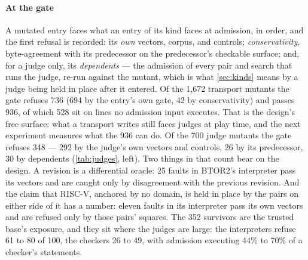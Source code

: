 \paragraph{At the gate}
A mutated entry faces what an entry of its kind faces at admission,
in order, and the first refusal is recorded: its \emph{own} vectors,
corpus, and controls; \emph{conservativity}, byte-agreement with its
predecessor on the predecessor's checkable surface; and, for a judge
only, its \emph{dependents} --- the admission of every pair and
search that runs the judge, re-run against the mutant, which is what
\cref{sec:kinds} means by a judge being held in place after it
entered. Of the 1,672 transport mutants the gate refuses 736 (694 by
the entry's own gate, 42 by conservativity) and passes 936, of which
528 sit on lines no admission input executes. That is the design's
free surface: what a transport writes still faces judges at play
time, and the next experiment measures what the 936 can do. Of the
700 judge mutants the gate refuses 348 --- 292 by the judge's own
vectors and controls, 26 by its predecessor, 30 by dependents
(\cref{tab:judges}, left). Two things in that count bear on the
design. A revision is a differential oracle: 25 faults in BTOR2's
interpreter pass its vectors and are caught only by disagreement with
the previous revision. And the claim that RISC-V, anchored by no
domain, is held in place by the pairs on either side of it has a
number: eleven faults in its interpreter pass its own vectors and are
refused only by those pairs' squares. The 352 survivors are the
trusted base's exposure, and they sit where the judges are large: the
interpreters refuse 61 to 80 of 100, the checkers 26 to 49, with
admission executing 44\% to 70\% of a checker's statements.

